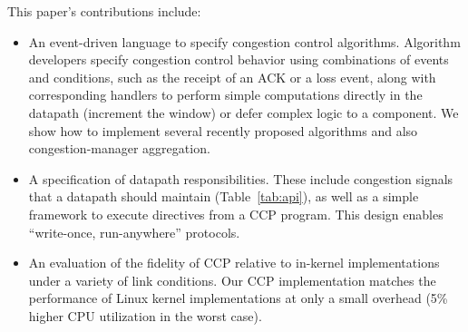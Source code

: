 \smallskip 
This paper's contributions include:

\begin{itemize}
\item An event-driven language to specify congestion control
  algorithms. Algorithm developers specify congestion control behavior using
  combinations of events and conditions, such as the receipt of an
  ACK or a loss event, along with corresponding handlers to perform
  simple computations directly in the datapath (\eg increment the window) or defer
  complex logic to a \userspace component. We show how to implement several recently proposed algorithms and also congestion-manager aggregation. 

\item A specification of datapath responsibilities. These include congestion
  signals that a datapath should maintain (Table~\ref{tab:api}), as
  well as a simple framework to execute directives from a CCP program. This
  design enables ``write-once, run-anywhere'' protocols.


\item An evaluation of the fidelity of CCP relative to in-kernel
  implementations under a variety of link conditions. Our CCP implementation
  matches the performance of Linux kernel implementations at only a small
  overhead (5\% higher CPU utilization in the worst case).

\end{itemize}
